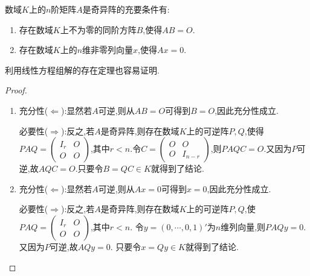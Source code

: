 \documentclass[../../main.tex]{subfiles}%
\begin{document}
\begin{proposition}[奇异阵的充要条件]\label{proposition:奇异阵的充要条件}
数域$K$上的$n$阶矩阵$A$是奇异阵的充要条件有:
\begin{enumerate}
\item\label{proposition:奇异阵的充要条件1} 存在数域$K$上不为零的同阶方阵$B$,使得$AB=O$.
\item\label{proposition:奇异阵的充要条件2} 存在数域$K$上的$n$维非零列向量$x$,使得$Ax=0$.
\end{enumerate}
\end{proposition}
\begin{remark}
利用线性方程组解的存在定理也容易证明.
\end{remark}
\begin{proof}
\begin{enumerate}
\item 充分性($\Leftarrow$):显然若\(A\)可逆,则从\(AB = O\)可得到\(B = O\),因此充分性成立.

必要性($\Rightarrow$):反之,若\(A\)是奇异阵,则存在数域$K$上的可逆阵\(P,Q\),使得\(PAQ = \begin{pmatrix}I_r & O \\ O & O\end{pmatrix}\),其中\(r < n\).令\(C = \begin{pmatrix}O & O \\ O & I_{n - r}\end{pmatrix}\),则\(PAQC = O\).又因为\(P\)可逆,故\(AQC = O\).只要令\(B = QC\in K\)就得到了结论.

\item 充分性($\Leftarrow$):显然若\(A\)可逆,则从\(Ax = 0\)可得到\(x = 0\),因此充分性成立.

必要性($\Rightarrow$):反之,若\(A\)是奇异阵,则存在数域$K$上的可逆阵\(P,Q\),使\(PAQ = \begin{pmatrix}I_r & O \\ O & O\end{pmatrix}\),其中\(r < n\).
令\(y = (0,\cdots,0,1)'\)为\(n\)维列向量,则\(PAQy = 0\).又因为\(P\)可逆,故\(AQy = 0\).
只要令\(x = Qy\in K\)就得到了结论.
\end{enumerate}
\end{proof}
\end{document}
